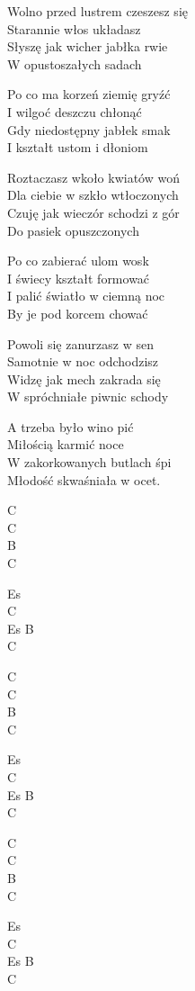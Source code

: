\begin{text}
    Wolno przed lustrem czeszesz się\\
    Starannie włos układasz\\
    Słyszę jak wicher jabłka rwie\\
    W opustoszałych sadach

    \vin Po co ma korzeń ziemię gryźć\\
    \vin I wilgoć deszczu chłonąć\\
    \vin Gdy niedostępny jabłek smak\\
    \vin I kształt ustom i dłoniom

    Roztaczasz wkoło kwiatów woń\\
    Dla ciebie w szkło wtłoczonych\\
    Czuję jak wieczór schodzi z gór\\
    Do pasiek opuszczonych

    \vin Po co zabierać ulom wosk\\
    \vin I świecy kształt formować\\
    \vin I palić światło w ciemną noc\\
    \vin By je pod korcem chować

    Powoli się zanurzasz w sen\\
    Samotnie w noc odchodzisz\\
    Widzę jak mech zakrada się\\
    W spróchniałe piwnic schody

    \vin A trzeba było wino pić\\
    \vin Miłością karmić noce\\
    \vin W zakorkowanych butlach śpi\\
    \vin Młodość skwaśniała w ocet.
\end{text}
\begin{chord}
    C\\
    C\\
    B\\
    C

    Es\\
    C\\
    Es B\\
    C

    C\\
    C\\
    B\\
    C

    Es\\
    C\\
    Es B\\
    C

    C\\
    C\\
    B\\
    C

    Es\\
    C\\
    Es B\\
    C
\end{chord}